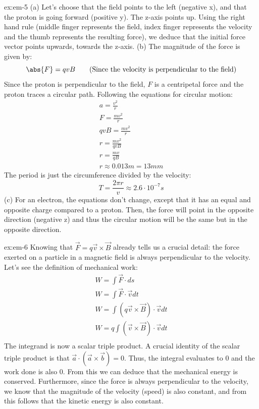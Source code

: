 \begin{solution}{ex:em-5}
  (a)
  Let's choose that the field points to the left (negative x), and that the proton is going forward (positive y). The z-axis points up. Using the right hand rule (middle finger represents the field, index finger represents the velocity and the thumb represents the resulting force), we deduce that the initial force vector points upwards, towards the z-axis.
  (b) The magnitude of the force is given by:
  \[
    \abs{F}=qvB \qquad\text{(Since the velocity is perpendicular to the field)}
  \]
  Since the proton is perpendicular to the field, $F$ is a centripetal force and the proton traces a circular path. Following the equations for circular motion:
  \[
    \begin{gathered}
      a=\frac{v^2}{r}\\
      F=\frac{mv^2}{r}\\
      qvB=\frac{mv^2}{r}\\
      r=\frac{mv^2}{qvB}\\
      r=\frac{mv}{qB}\\
      r\approx0.013m=13mm
    \end{gathered}
  \]
  The period is just the circumference divided by the velocity:
  \[
    T=\frac{2\pi r}{v}\approx2.6\cdot10^{-7}s
  \]
  (c) For an electron, the equations don't change, except that it has an equal and opposite charge compared to a proton. Then, the force will point in the opposite direction (negative z) and thus the circular motion will be the same but in the opposite direction.
\end{solution}
\begin{solution}{ex:em-6}
  Knowing that $\overrightarrow{F}=q\overrightarrow{v}\times\overrightarrow{B}$ already tells us a crucial detail: the force exerted on a particle in a magnetic field is always perpendicular to the velocity. Let's see the definition of mechanical work:
  \[
    \begin{gathered}
      W =\int \overrightarrow{F}\cdot ds\\
      W =\int \overrightarrow{F} \cdot \overrightarrow{v} dt\\
      W =\int (q \overrightarrow{v}\times \overrightarrow{B}) \cdot \overrightarrow{v} dt \\
      W =q\int(\overrightarrow{v}\times \overrightarrow{B}) \cdot \overrightarrow{v} dt \\
    \end{gathered}
  \]
  The integrand is now a scalar triple product. A crucial identity of the scalar triple product is that $\overrightarrow{a}\cdot(\overrightarrow{a}\times \overrightarrow{b})=0$. Thus, the integral evaluates to 0 and the work done is also 0.
  From this we can deduce that the mechanical energy is conserved. Furthermore, since the force is always perpendicular to the velocity, we know that the magnitude of the velocity (speed) is also constant, and from this follows that the kinetic energy is also constant.
\end{solution}
